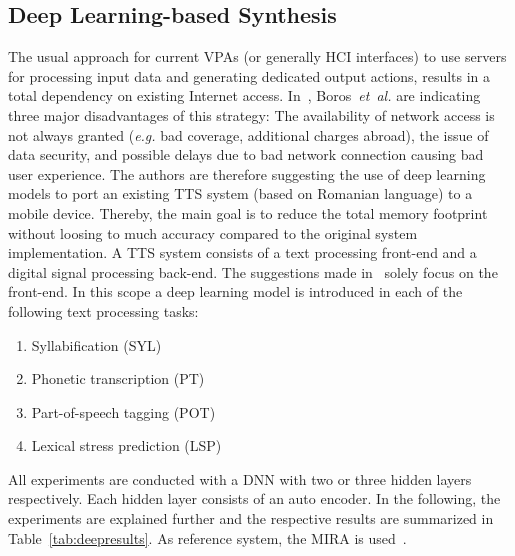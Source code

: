 \subsection{Deep Learning-based Synthesis}
\label{subsec:deepembedded}

The usual approach for current \acfp{VPA} (or generally \ac{HCI} interfaces) to use servers for processing input data and generating dedicated output actions, results in a total dependency on existing Internet access. In~\cite{boros:robust}, Boros~\textit{et~al.} are indicating three major disadvantages of this strategy: The availability of network access is not always granted (\textit{e.g.} bad coverage, additional charges abroad), the issue of data security, and possible delays due to bad network connection causing bad user experience. The authors are therefore suggesting the use of deep learning models to port an existing \ac{TTS} system (based on Romanian language) to a mobile device. Thereby, the main goal is to reduce the total memory footprint without loosing to much accuracy compared to the original system implementation. A \ac{TTS} system consists of a text processing front-end and a digital signal processing back-end. The suggestions made in~\cite{boros:robust} solely focus on the front-end. In this scope a deep learning model is introduced in each of the following text processing tasks:

\begin{enumerate}[label=\arabic*.]		%
	\parskip0.25em
	\bfseries
	\item Syllabification (SYL)
	\item Phonetic transcription (PT)
	\item Part-of-speech tagging (POT)
	\item Lexical stress prediction (LSP)
\end{enumerate}

\noindent All experiments are conducted with a \ac{DNN} with two or three hidden layers respectively. Each hidden layer consists of an auto encoder. In the following, the experiments are explained further and the respective results are summarized in Table~\ref{tab:deepresults}. As reference system, the \ac{MIRA} is used~\cite{boros:mira}.

